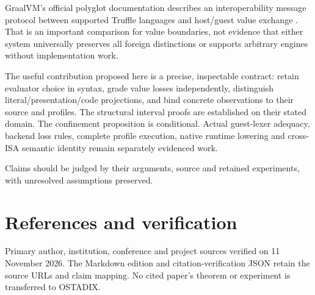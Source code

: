 \documentclass[11pt]{article}
\begin{document}
GraalVM's official polyglot documentation describes an interoperability message protocol between supported Truffle languages and host/guest value exchange \cite{graalvm}. That is an important comparison for value boundaries, not evidence that either system universally preserves all foreign distinctions or supports arbitrary engines without implementation work.

The useful contribution proposed here is a precise, inspectable contract: retain evaluator choice in syntax, grade value losses independently, distinguish literal/presentation/code projections, and bind concrete observations to their source and profiles. The structural interval proofs are established on their stated domain. The confinement proposition is conditional. Actual guest-lexer adequacy, backend loss rules, complete profile execution, native runtime lowering and cross-ISA semantic identity remain separately evidenced work.

Claims should be judged by their arguments, source and retained experiments, with unresolved assumptions preserved.

\clearpage\section*{References and verification}
Primary author, institution, conference and project sources verified on 11 November 2026. The Markdown edition and citation-verification JSON retain the source URLs and claim mapping. No cited paper's theorem or experiment is transferred to OSTADIX.
\end{document}
